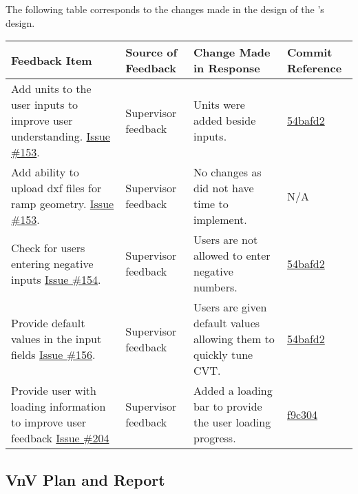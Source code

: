 \documentclass{article}
\begin{document}
\noindent The following table corresponds to the changes made in the design of the \progname's  design.
\begin{longtable}{|p{4cm}|p{1.5cm}|p{4cm}|p{1.5cm}|}
    \hline
    \textbf{Feedback Item} & \textbf{Source of Feedback} & \textbf{Change Made in Response} & \textbf{Commit Reference} \\
    \hline
    \endfirsthead
    \hline
    \endhead
    \hline
    \endfoot
    \hline
    \endlastfoot
    Add units to the user inputs to improve user understanding. \href{https://github.com/gr812b/CVT-Simulator/issues/153}{Issue \#153}. & Supervisor feedback & Units were added beside inputs. & 
    \href{https://github.com/gr812b/CVT-Simulator/commit/54bafd2bf352567aea47488b067127ec2b9f7a34}{54bafd2} \\ 
    \hline 
    Add ability to upload dxf files for ramp geometry. \href{https://github.com/gr812b/CVT-Simulator/issues/157}{Issue \#153}. & Supervisor feedback & No changes as did not have time to implement. & 
    N/A \\ 
    \hline
    Check for users entering negative inputs  \href{https://github.com/gr812b/CVT-Simulator/issues/154}{Issue \#154}. & Supervisor feedback & Users are not allowed to enter negative numbers. & 
    \href{https://github.com/gr812b/CVT-Simulator/commit/54bafd2bf352567aea47488b067127ec2b9f7a34}{54bafd2} \\ 
    \hline 
    Provide default values in the input fields \href{https://github.com/gr812b/CVT-Simulator/issues/156}{Issue \#156}. & Supervisor feedback & Users are given default values allowing them to quickly tune CVT. & 
    \href{https://github.com/gr812b/CVT-Simulator/commit/54bafd2bf352567aea47488b067127ec2b9f7a34}{54bafd2} \\ 
    \hline 
    Provide user with loading information to improve user feedback \href{https://github.com/gr812b/CVT-Simulator/issues/204}{Issue \#204} & Supervisor feedback & Added a loading bar to provide the user loading progress. & 
    \href{https://github.com/gr812b/CVT-Simulator/commit/f9c304efe46558aaa3f681d34d50404b479b3449}{f9c304} \\ 

\end{longtable}

\subsection{VnV Plan and Report}
\end{document}
